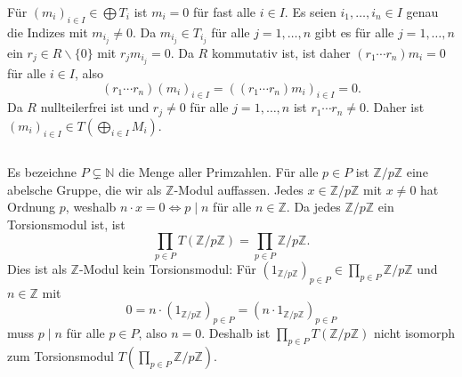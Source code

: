 \documentclass[a4paper,10pt]{article}
\theoremstyle{definition}
\newcommand{\N}{\mathbb{N}}
\newcommand{\Z}{\mathbb{Z}}
\begin{document}
Für $(m_i)_{i \in I} \in \bigoplus T_i$ ist $m_i = 0$ für fast alle $i \in I$. Es seien $i_1, \ldots, i_n \in I$ genau die Indizes mit $m_{i_j} \neq 0$. Da $m_{i_j} \in T_{i_j}$ für alle $j=1,\ldots,n$ gibt es für alle $j=1,\ldots,n$ ein $r_j \in R \smallsetminus \{0\}$ mit $r_j m_{i_j} = 0$. Da $R$ kommutativ ist, ist daher $(r_1 \cdots r_n) m_i = 0$ für alle $i \in I$, also
\[
 (r_1 \cdots r_n) (m_i)_{i \in I} = ((r_1 \cdots r_n) m_i)_{i \in I} = 0.
\]
Da $R$ nullteilerfrei ist und $r_j \neq 0$ für alle $j=1,\ldots,n$ ist $r_1 \cdots r_n \neq 0$. Daher ist $(m_i)_{i \in I} \in T(\bigoplus_{i \in I} M_i)$.


\subsection{}
Es bezeichne $P \subsetneq \N$ die Menge aller Primzahlen. Für alle $p \in P$ ist $\Z/p\Z$ eine abelsche Gruppe, die wir als $\Z$-Modul auffassen. Jedes $x \in \Z/p\Z$ mit $x \neq 0$ hat Ordnung $p$, weshalb $n \cdot x = 0 \Leftrightarrow p \mid n$ für alle $n \in \Z$. Da jedes $\Z/p\Z$ ein Torsionsmodul ist, ist
\[
 \prod_{p \in P} T(\Z/p\Z) = \prod_{p \in P} \Z/p\Z.
\]
Dies ist als $\Z$-Modul kein Torsionsmodul: Für $(1_{\Z/p\Z})_{p \in P} \in \prod_{p \in P} \Z/p\Z$ und $n \in \Z$ mit
\[
 0 = n \cdot (1_{\Z/p\Z})_{p \in P} = (n \cdot 1_{\Z/p\Z})_{p \in P}
\]
muss $p \mid n$ für alle $p \in P$, also $n = 0$. Deshalb ist $\prod_{p \in P} T(\Z/p\Z)$ nicht isomorph zum Torsionsmodul $T(\prod_{p \in P} \Z/p\Z)$.
\end{document}
